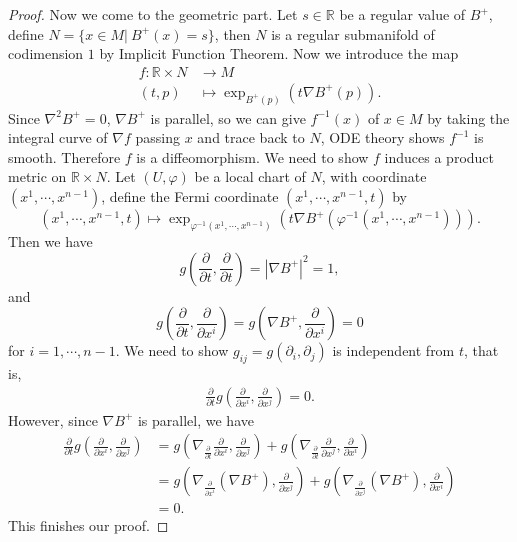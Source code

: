 \begin{proof}
    Now we come to the geometric part.
    Let $s\in\mathbb{R}$ be a regular value of $B^+$, define $N=\{x\in M|\ B^+(x)=s\}$, then $N$ is a regular submanifold of codimension $1$ by Implicit Function Theorem.
    Now we introduce the map
    \begin{align*}
        f:\mathbb{R}\times N&\to M\\
        (t,p)&\mapsto\exp_{B^+(p)}(t\nabla B^+(p)).
    \end{align*}
    Since $\nabla^2B^+=0$, $\nabla B^+$ is parallel, so we can give $f^{-1}(x)$ of $x\in M$ by taking the integral curve of $\nabla f$ passing $x$ and trace back to $N$, ODE theory shows $f^{-1}$ is smooth.
    Therefore $f$ is a diffeomorphism.
    We need to show $f$ induces a product metric on $\mathbb{R}\times N$.
    Let $(U,\varphi)$ be a local chart of $N$, with coordinate $(x^1,\cdots,x^{n-1})$, define the Fermi coordinate $(x^1,\cdots,x^{n-1},t)$ by
    \[(x^1,\cdots,x^{n-1},t)\mapsto\exp_{\varphi^{-1}(x^1,\cdots,x^{n-1})}(t\nabla B^+(\varphi^{-1}(x^1,\cdots,x^{n-1}))).\]
    Then we have
    \[g\left(\frac{\partial{}}{\partial{t}},\frac{\partial{}}{\partial{t}}\right)=|\nabla B^+|^2=1,\]
    and
    \[g\left(\frac{\partial{}}{\partial{t}},\frac{\partial{}}{\partial{x^i}}\right)=g\left(\nabla B^+,\frac{\partial{}}{\partial{x^i}}\right)=0\]
    for $i=1,\cdots,n-1$.
    We need to show $g_{ij}=g(\partial_i,\partial_j)$ is independent from $t$, that is,
    \begin{align*}
        \frac{\partial{}}{\partial{t}}g\left(\frac{\partial{}}{\partial{x^i}},\frac{\partial{}}{\partial{x^j}}\right)=0.
    \end{align*}
    However, since $\nabla B^+$ is parallel, we have
    \begin{align*}
        \frac{\partial{}}{\partial{t}}g\left(\frac{\partial{}}{\partial{x^i}},\frac{\partial{}}{\partial{x^j}}\right)&=g\left(\nabla_{\frac{\partial{}}{\partial{t}}}\frac{\partial{}}{\partial{x^i}},\frac{\partial{}}{\partial{x^j}}\right)+g\left(\nabla_{\frac{\partial{}}{\partial{t}}}\frac{\partial{}}{\partial{x^j}},\frac{\partial{}}{\partial{x^i}}\right)\\
        &=g\left(\nabla_{\frac{\partial{}}{\partial{x^i}}}(\nabla B^+),\frac{\partial{}}{\partial{x^j}}\right)+g\left(\nabla_{\frac{\partial{}}{\partial{x^j}}}(\nabla B^+),\frac{\partial{}}{\partial{x^i}}\right)\\
        &=0.
    \end{align*}
    This finishes our proof.
\end{proof}